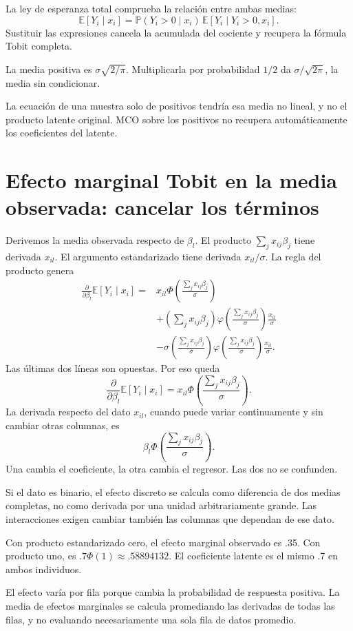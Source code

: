 \documentclass[11pt,a4paper]{article}
\newcommand{\E}{\mathbb E}
\newcommand{\Prob}{\mathbb P}
\begin{document}
La ley de esperanza total comprueba
la relación entre ambas medias:
\[
\E[Y_i\mid x_i]
=\Prob(Y_i>0\mid x_i)
\,\E[Y_i\mid Y_i>0,x_i].
\]
Sustituir las expresiones cancela
la acumulada del cociente
y recupera la fórmula Tobit completa.

\begin{ejemplo}
La media positiva es
\(\sigma\sqrt{2/\pi}\).
Multiplicarla por probabilidad \(1/2\)
da \(\sigma/\sqrt{2\pi}\),
la media sin condicionar.
\end{ejemplo}
La ecuación de una muestra
solo de positivos tendría
esa media no lineal,
y no el producto latente original.
MCO sobre los positivos no
recupera automáticamente
los coeficientes del latente.

\clearpage
\section{Efecto marginal Tobit en la media observada: cancelar los términos}\label{unidad89}
Derivemos la media observada respecto de \(\beta_l\).
El producto \(\sum_jx_{ij}\beta_j\) tiene derivada \(x_{il}\).
El argumento estandarizado tiene derivada \(x_{il}/\sigma\).
La regla del producto genera
\[
\begin{aligned}
\frac{\partial}{\partial\beta_l}\E[Y_i\mid x_i]
={}&x_{il}\Phi\left(\frac{\sum_jx_{ij}\beta_j}{\sigma}\right)\\
&+\left(\sum_jx_{ij}\beta_j\right)
\varphi\left(\frac{\sum_jx_{ij}\beta_j}{\sigma}\right)\frac{x_{il}}{\sigma}\\
&-\sigma\left(\frac{\sum_jx_{ij}\beta_j}{\sigma}\right)
\varphi\left(\frac{\sum_jx_{ij}\beta_j}{\sigma}\right)\frac{x_{il}}{\sigma}.
\end{aligned}
\]
Las últimas dos líneas son opuestas.
Por eso queda
\[
\frac{\partial}{\partial\beta_l}\E[Y_i\mid x_i]
=x_{il}\Phi\left(\frac{\sum_jx_{ij}\beta_j}{\sigma}\right).
\]
La derivada respecto del dato \(x_{il}\),
cuando puede variar continuamente y sin
cambiar otras columnas, es
\[
\beta_l\Phi\left(\frac{\sum_jx_{ij}\beta_j}{\sigma}\right).
\]
Una cambia el coeficiente,
la otra cambia el regresor.
Las dos no se confunden.

Si el dato es binario,
el efecto discreto se calcula
como diferencia de dos medias
completas, no como derivada
por una unidad arbitrariamente grande.
Las interacciones exigen cambiar
también las columnas que dependan
de ese dato.

\begin{ejemplo}[Pendiente .7]
Con producto estandarizado cero,
el efecto marginal observado es .35.
Con producto uno, es
\(.7\Phi(1)\approx.58894132\).
El coeficiente latente es el
mismo .7 en ambos individuos.
\end{ejemplo}
El efecto varía por fila
porque cambia la probabilidad
de respuesta positiva.
La media de efectos marginales
se calcula promediando las
derivadas de todas las filas,
y no evaluando necesariamente
una sola fila de datos promedio.
\end{document}
